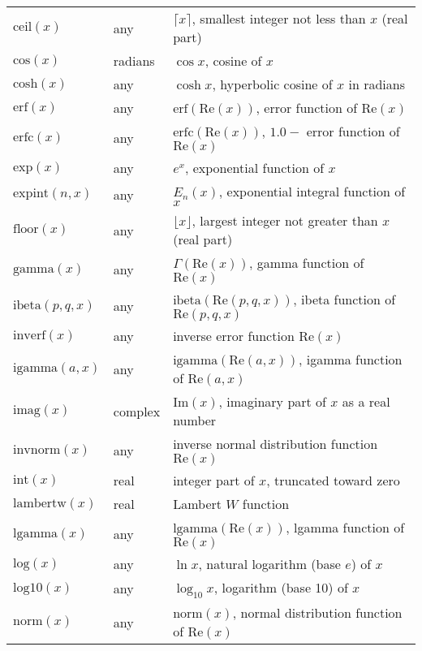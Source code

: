 \documentclass[
  hyper,    
  lang=cn,
  class=book,
  bib_index={load},
  mathSpec={envStyle=leftbar, alias},
  toc={column=2, title=目录},
]{zlatex}
\begin{document}
\begin{center}
\begin{longtable}{lll}
        \(\text{ceil}(x)\) & any & $\lceil x \rceil$, smallest integer not less than $x$ (real part) \\
        \(\text{cos}(x)\) & radians & $\cos x$, cosine of $x$ \\
        \(\text{cosh}(x)\) & any & $\cosh x$, hyperbolic cosine of $x$ in radians \\
        \(\text{erf}(x)\) & any & $\text{erf}(\text{Re}(x))$, error function of $\text{Re}(x)$ \\
        \(\text{erfc}(x)\) & any & $\text{erfc}(\text{Re}(x))$, $1.0 - $ error function of $\text{Re}(x)$ \\
        \(\text{exp}(x)\) & any & $e^x$, exponential function of $x$ \\
        \(\text{expint}(n,x)\) & any & $E_n(x)$, exponential integral function of $x$ \\
        \(\text{floor}(x)\) & any & $\lfloor x \rfloor$, largest integer not greater than $x$ (real part) \\
        \(\text{gamma}(x)\) & any & $\Gamma(\text{Re}(x))$, gamma function of $\text{Re}(x)$ \\
        \(\text{ibeta}(p,q,x)\) & any & $\text{ibeta}(\text{Re}(p,q,x))$, ibeta function of $\text{Re}(p,q,x)$ \\
        \(\text{inverf}(x)\) & any & inverse error function $\text{Re}(x)$ \\
        \(\text{igamma}(a,x)\) & any & $\text{igamma}(\text{Re}(a,x))$, igamma function of $\text{Re}(a,x)$ \\
        \(\text{imag}(x)\) & complex & $\text{Im}(x)$, imaginary part of $x$ as a real number \\
        \(\text{invnorm}(x)\) & any & inverse normal distribution function $\text{Re}(x)$ \\
        \(\text{int}(x)\) & real & integer part of $x$, truncated toward zero \\
        \(\text{lambertw}(x)\) & real & Lambert $W$ function \\
        \(\text{lgamma}(x)\) & any & $\text{lgamma}(\text{Re}(x))$, lgamma function of $\text{Re}(x)$ \\
        \(\text{log}(x)\) & any & $\ln x$, natural logarithm (base $e$) of $x$ \\
        \(\text{log10}(x)\) & any & $\log_{10} x$, logarithm (base 10) of $x$ \\
        \(\text{norm}(x)\) & any & $\text{norm}(x)$, normal distribution function of $\text{Re}(x)$ \\

\end{longtable}
\end{center}
\end{document}
